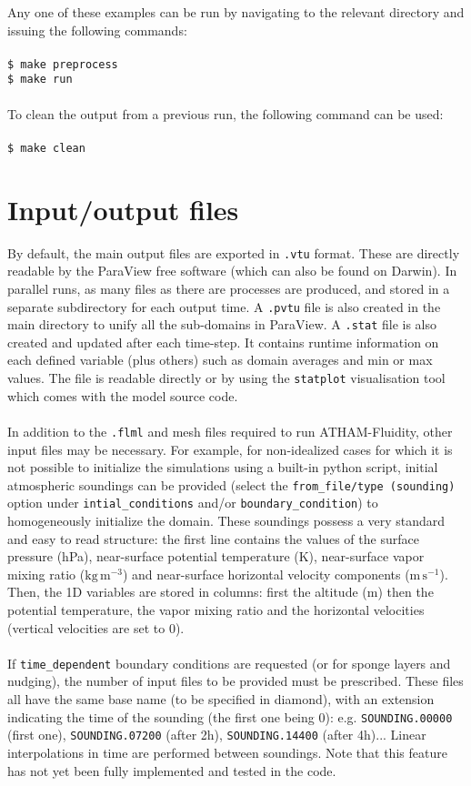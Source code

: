 \documentclass[10pt,a4paper]{article}
\newcommand\tab[1][0.5cm]{\hspace*{#1}}
\begin{document}
Any one of these examples can be run by navigating to the relevant directory and issuing the following commands:\\\\
\tab \texttt{\$ make preprocess}\\
\tab \texttt{\$ make run}\\\\
To clean the output from a previous run, the following command can be used:\\\\
\tab \texttt{\$ make clean}

\section{Input/output files} \label{IO}
By default, the main output files are exported in \texttt{.vtu} format. These are directly readable by the ParaView free software (which can also be found on Darwin). In parallel runs, as many files as there are processes are produced, and stored in a separate subdirectory for each output time. A \texttt{.pvtu} file is also created in the main directory to unify all the sub-domains in ParaView. A \texttt{.stat} file is also created and updated after each time-step. It contains runtime information on each defined variable (plus others) such as domain averages and min or max values. The file is readable directly or by using the \texttt{statplot} visualisation tool which comes with the model source code.\\\\
In addition to the \texttt{.flml} and mesh files required to run ATHAM-Fluidity, other input files may be necessary. For example, for non-idealized cases for which it is not possible to initialize the simulations using a built-in python script, initial atmospheric soundings can be provided (select the \texttt{from\_file/type (sounding)} option under \texttt{intial\_conditions} and/or \texttt{boundary\_condition}) to homogeneously initialize the domain. These soundings possess a very standard and easy to read structure: the first line contains the values of the surface pressure (hPa), near-surface potential temperature (K), near-surface vapor mixing ratio ($\mathrm{kg \, m^{-3}}$) and near-surface horizontal velocity components ($\mathrm{m \, s^{-1}}$). Then, the 1D variables are stored in columns: first the altitude (m) then the potential temperature, the vapor mixing ratio and the horizontal velocities (vertical velocities are set to 0).\\\\ 
If \texttt{time\_dependent} boundary conditions are requested (or for sponge layers and nudging), the number of input files to be provided must be prescribed. These files all have the same base name (to be specified in diamond), with an extension indicating the time of the sounding (the first one being 0): e.g. \texttt{SOUNDING.00000} (first one), \texttt{SOUNDING.07200} (after 2h), \texttt{SOUNDING.14400} (after 4h)... Linear interpolations in time are performed between soundings. Note that this feature has not yet been fully implemented and tested in the code.


%
\end{document}
